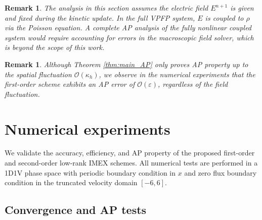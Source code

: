 \documentclass[]{article}
\numberwithin{equation}{section}
\newtheorem{remark}[theorem]{Remark}
\begin{document}
\begin{remark}
The analysis in this section assumes the electric field $E^{n+1}$ is given and fixed during the kinetic update. In the full VPFP system, $E$ is coupled to $\rho$ via the Poisson equation. A complete AP analysis of the fully nonlinear coupled system would require accounting for errors in the macroscopic field solver, which is beyond the scope of this work.
\end{remark}

\begin{remark}
Although Theorem \ref{thm:main_AP} only proves AP property up to the spatial fluctuation  $\mathcal{O}(\kappa_h)$, we observe in the numerical experiments that the first-order scheme exhibits an AP error of $\mathcal{O}(\varepsilon)$, regardless of the field fluctuation.

\end{remark}


\section{Numerical experiments}
\label{sec:numerical_experiments}
We validate the accuracy, efficiency, and AP property of the proposed first-order and second-order low-rank IMEX schemes. All numerical tests are performed in a 1D1V phase space with periodic boundary condition in $x$ and zero flux boundary condition in the truncated velocity domain $[-6,6]$.



\subsection{Convergence and AP tests}
\label{sec:conv_ap_tests}
\end{document}
